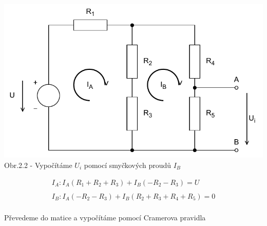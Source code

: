 \begin{center}
    \includegraphics[scale=0.8,keepaspectratio]{fig/solutions/02-sol/02-step2.pdf} \\
    
    Obr.2.2 - Vypočítáme $U_i$ pomocí smyčkových proudů $I_B$
\end{center}

\begin{gather*}
    I_A: I_A(R_1 + R_2 + R_3) + I_B(-R_2 - R_3) = U \\\\
    I_B: I_A(-R_2 - R_3) + I_B(R_2 + R_3 + R_4 + R_5) = 0 \\
\end{gather*}

Převedeme do matice a vypočítáme pomocí Cramerova pravidla
    

